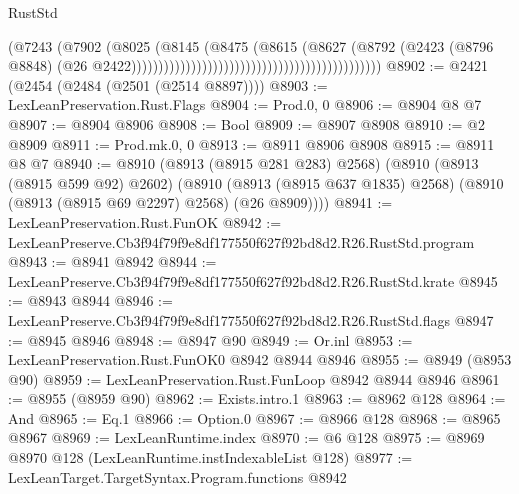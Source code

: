\begin{lexlean}{RustStd}
\begin{coremodule}
                                                                            (@7243
                                                                              (@7902
                                                                                (@8025
                                                                                  (@8145
                                                                                    (@8475
                                                                                      (@8615
                                                                                        (@8627
                                                                                          (@8792
                                                                                            (@2423
                                                                                              (@8796
                                                                                                @8848)
                                                                                              (@26
                                                                                                @2422))))))))))))))))))))))))))))))))))))))))))))))
@8902 := @2421 (@2454 (@2484 (@2501 (@2514 @8897))))
@8903 := LexLeanPreservation.Rust.Flags
@8904 := Prod.{0, 0}
@8906 := @8904 @8 @7
@8907 := @8904 @8906
@8908 := Bool
@8909 := @8907 @8908
@8910 := @2 @8909
@8911 := Prod.mk.{0, 0}
@8913 := @8911 @8906 @8908
@8915 := @8911 @8 @7
@8940 := @8910
    (@8913 (@8915 @281 @283) @2568)
    (@8910
      (@8913 (@8915 @599 @92) @2602)
      (@8910 (@8913 (@8915 @637 @1835) @2568) (@8910 (@8913 (@8915 @69 @2297) @2568) (@26 @8909))))
@8941 := LexLeanPreservation.Rust.FunOK
@8942 := LexLeanPreserve.Cb3f94f79f9e8df177550f627f92bd8d2.R26.RustStd.program
@8943 := @8941 @8942
@8944 := LexLeanPreserve.Cb3f94f79f9e8df177550f627f92bd8d2.R26.RustStd.krate
@8945 := @8943 @8944
@8946 := LexLeanPreserve.Cb3f94f79f9e8df177550f627f92bd8d2.R26.RustStd.flags
@8947 := @8945 @8946
@8948 := @8947 @90
@8949 := Or.inl
@8953 := LexLeanPreservation.Rust.FunOK0 @8942 @8944 @8946
@8955 := @8949 (@8953 @90)
@8959 := LexLeanPreservation.Rust.FunLoop @8942 @8944 @8946
@8961 := @8955 (@8959 @90)
@8962 := Exists.intro.{1}
@8963 := @8962 @128
@8964 := And
@8965 := Eq.{1}
@8966 := Option.{0}
@8967 := @8966 @128
@8968 := @8965 @8967
@8969 := LexLeanRuntime.index
@8970 := @6 @128
@8975 := @8969 @8970 @128 (LexLeanRuntime.instIndexableList @128)
@8977 := LexLeanTarget.TargetSyntax.Program.functions @8942

\end{coremodule}
\end{lexlean}
